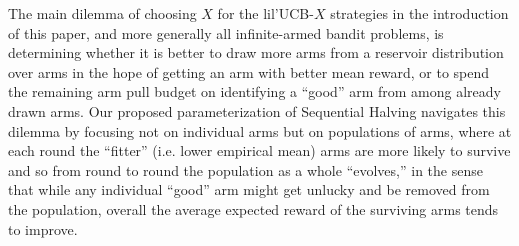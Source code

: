 The main dilemma of choosing $X$ for the lil'UCB-$X$ strategies in the introduction of this paper, and more generally all infinite-armed bandit problems, is determining whether it is better to draw more arms from a reservoir distribution over arms in the hope of getting an arm with better mean reward, or to spend the remaining arm pull budget on identifying a ``good'' arm from among already drawn arms.
Our proposed parameterization of Sequential Halving navigates this dilemma by focusing not on individual arms but on populations of arms, where at each round the ``fitter'' (i.e. lower empirical mean) arms are more likely to survive and so from round to round the population as a whole ``evolves,'' in the sense that while any individual ``good'' arm might get unlucky and be removed from the population, overall the average expected reward of the surviving arms tends to improve.









